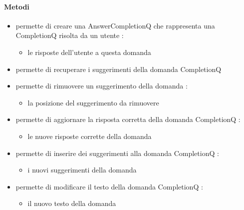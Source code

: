 \paragraph{Metodi}
\begin{itemize}
\item {}
\newline
permette di creare una AnswerCompletionQ che rappresenta una CompletionQ risolta da un utente
\newline
{} :
\begin{itemize}
\item {}
\newline
le risposte dell'utente a questa domanda
\end{itemize}
\item {}
\newline
permette di recuperare i suggerimenti della domanda CompletionQ
\newline
\item {}
\newline
permette di rimuovere un suggerimento della domanda
\newline
{} :
\begin{itemize}
\item {}
\newline
la posizione del suggerimento da rimuovere
\end{itemize}
\item {}
\newline
permette di aggiornare la risposta corretta della domanda CompletionQ
\newline
{} :
\begin{itemize}
\item {}
\newline
le nuove risposte corrette della domanda
\end{itemize}
\item {}
\newline
permette di inserire dei suggerimenti alla domanda CompletionQ
\newline
{} :
\begin{itemize}
\item {}
\newline
i nuovi suggerimenti della domanda
\end{itemize}
\item {}
\newline
permette di modificare il testo della domanda CompletionQ
\newline
{} :
\begin{itemize}
\item {}
\newline
il nuovo testo della domanda
\end{itemize}
\end{itemize}
